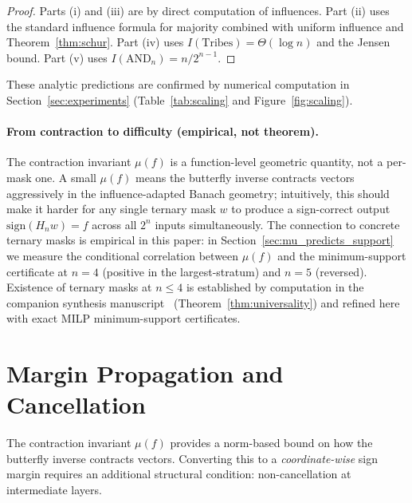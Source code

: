 \documentclass[11pt]{article}
\newcommand{\sign}{\mathrm{sign}}
\begin{document}
\begin{proof}
Parts (i) and (iii) are by direct computation of influences. Part (ii) uses the standard influence formula for majority \cite[Proposition~2.22]{odonnell2014analysis} combined with uniform influence and Theorem~\ref{thm:schur}. Part (iv) uses $I(\mathrm{Tribes}) = \Theta(\log n)$ \cite[Exercise~2.15]{odonnell2014analysis} and the Jensen bound. Part (v) uses $I(\mathrm{AND}_n) = n/2^{n-1}$.
\end{proof}

These analytic predictions are confirmed by numerical computation in Section~\ref{sec:experiments} (Table~\ref{tab:scaling} and Figure~\ref{fig:scaling}).

\paragraph{From contraction to difficulty (empirical, not theorem).}
The contraction invariant $\mu(f)$ is a function-level geometric quantity, not a per-mask one. A small $\mu(f)$ means the butterfly inverse contracts vectors aggressively in the influence-adapted Banach geometry; intuitively, this should make it harder for any single ternary mask $w$ to produce a sign-correct output $\sign(H_n w) = f$ across all $2^n$ inputs simultaneously. The connection to concrete ternary masks is empirical in this paper: in Section~\ref{sec:mu_predicts_support} we measure the conditional correlation between $\mu(f)$ and the minimum-support certificate at $n=4$ (positive in the largest-stratum) and $n=5$ (reversed). Existence of ternary masks at $n \le 4$ is established by computation in the companion synthesis manuscript~\cite{spectralSynthesisCompanion} (Theorem~\ref{thm:universality}) and refined here with exact MILP minimum-support certificates.


\section{Margin Propagation and Cancellation}
\label{sec:cancellation}

The contraction invariant $\mu(f)$ provides a norm-based bound on how the butterfly inverse contracts vectors. Converting this to a \emph{coordinate-wise} sign margin requires an additional structural condition: non-cancellation at intermediate layers.
\end{document}
